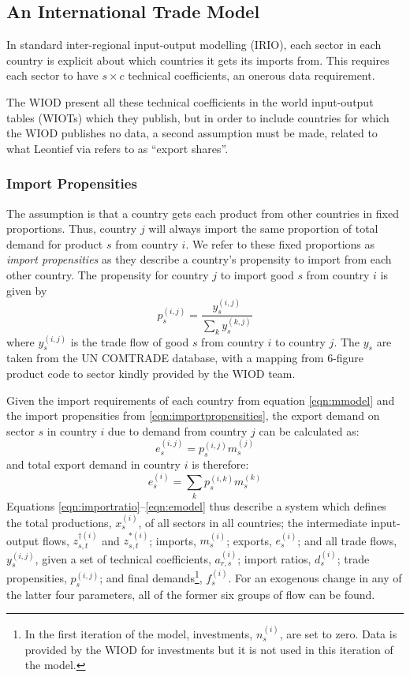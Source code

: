 \documentclass[a4paper]{article}
\begin{document}
\subsection{An International Trade Model}\label{sec:trade}
In standard inter-regional input-output modelling (IRIO), each sector in each country is explicit about which countries it gets its imports from. 
This requires each sector to have $s \times c$ technical coefficients, an onerous data requirement. 

The WIOD present all these technical coefficients in the world input-output tables (WIOTs) which they publish, but in order to include countries for which the WIOD publishes no data, a second assumption must be made, related to what Leontief via \textcite{Duchin2004} refers to as ``export shares''.

\subsubsection*{Import Propensities}
The assumption is that a country gets each product from other countries in fixed proportions. Thus, country $j$ will always import the same proportion of total demand for product $s$ from country $i$.
We refer to these fixed proportions as \textit{import propensities} as they describe a country's propensity to import from each other country. The propensity for country $j$ to import good $s$ from country $i$ is given by
\begin{equation}\label{eqn:importpropensities}
p^{(i,j)}_s = \frac{y^{(i,j)}_s}{\sum_k{y^{(k,j)}_s}}
\end{equation}
where $y^{(i,j)}_s$ is the trade flow of good $s$ from country $i$ to country $j$. The $y_s$ are taken from the UN COMTRADE database, with a mapping from 6-figure product code to sector kindly provided by the WIOD team.

Given the import requirements of each country from equation \eqref{eqn:mmodel} and the import propensities from \eqref{eqn:importpropensities}, the export demand on sector $s$ in country $i$ due to demand from country $j$ can be calculated as:
\begin{equation*}
e_s^{(i,j)} = p_s^{(i,j)}m_s^{(j)}
\end{equation*}
and total export demand in country $i$ is therefore:
\begin{equation}\label{eqn:emodel}
e_s^{(i)} = \sum_k{p_s^{(i,k)}m_s^{(k)}}
\end{equation}
\noindent Equations \eqref{eqn:importratio}--\eqref{eqn:emodel} thus describe a system which defines the total productions, $x_s^{(i)}$, of all sectors in all countries; the intermediate input-output flows, $z_{s,t}^{\dagger(i)}$ and $z_{s,t}^{*(i)}$; imports, $m_s^{(i)}$; exports, $e_s^{(i)}$; and all trade flows, $y_s^{(i,j)}$, given a set of technical coefficients, $a_{r,s}^{(i)}$; import ratios, $d_s^{(i)}$; trade propensities, $p_s^{(i,j)}$; and final demands\footnote{In the first iteration of the model, investments, $n_s^{(i)}$, are set to zero. 
Data is provided by the WIOD for investments but it is not used in this iteration of the model.}, $f_s^{(i)}$. For an exogenous change in any of the latter four parameters, all of the former six groups of flow can be found.
\end{document}
